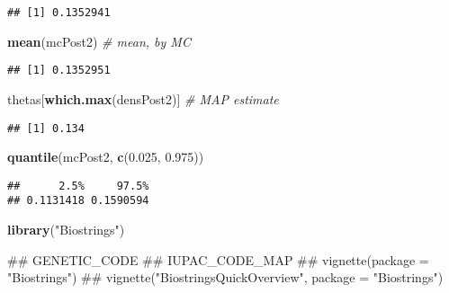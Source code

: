 \documentclass[]{article}
\newenvironment{Shaded}{\begin{snugshade}}{\end{snugshade}}
\newcommand{\KeywordTok}[1]{\textcolor[rgb]{0.13,0.29,0.53}{\textbf{#1}}}
\newcommand{\FloatTok}[1]{\textcolor[rgb]{0.00,0.00,0.81}{#1}}
\newcommand{\StringTok}[1]{\textcolor[rgb]{0.31,0.60,0.02}{#1}}
\newcommand{\CommentTok}[1]{\textcolor[rgb]{0.56,0.35,0.01}{\textit{#1}}}
\newcommand{\NormalTok}[1]{#1}
\begin{document}
\begin{verbatim}
## [1] 0.1352941
\end{verbatim}

\begin{Shaded}
\begin{Highlighting}[]
\KeywordTok{mean}\NormalTok{(mcPost2)                     }\CommentTok{# mean, by MC}
\end{Highlighting}
\end{Shaded}

\begin{verbatim}
## [1] 0.1352951
\end{verbatim}

\begin{Shaded}
\begin{Highlighting}[]
\NormalTok{thetas[}\KeywordTok{which.max}\NormalTok{(densPost2)]      }\CommentTok{# MAP estimate}
\end{Highlighting}
\end{Shaded}

\begin{verbatim}
## [1] 0.134
\end{verbatim}

\begin{Shaded}
\begin{Highlighting}[]
\KeywordTok{quantile}\NormalTok{(mcPost2, }\KeywordTok{c}\NormalTok{(}\FloatTok{0.025}\NormalTok{, }\FloatTok{0.975}\NormalTok{))}
\end{Highlighting}
\end{Shaded}

\begin{verbatim}
##      2.5%     97.5% 
## 0.1131418 0.1590594
\end{verbatim}

\begin{Shaded}
\begin{Highlighting}[]
\KeywordTok{library}\NormalTok{(}\StringTok{"Biostrings"}\NormalTok{)}
\end{Highlighting}
\end{Shaded}

\begin{Shaded}
\begin{Highlighting}[]
\NormalTok{## GENETIC_CODE}
\NormalTok{## IUPAC_CODE_MAP}
\NormalTok{## vignette(package = "Biostrings")}
\NormalTok{## vignette("BiostringsQuickOverview", package = "Biostrings")}
\end{Highlighting}
\end{Shaded}
\end{document}
